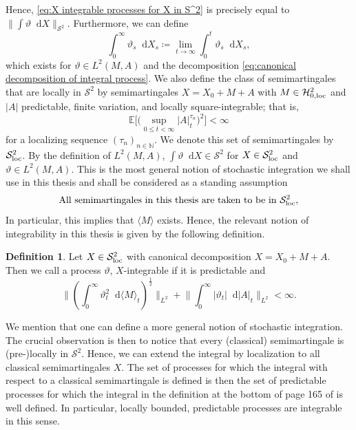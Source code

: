 \documentclass[11pt,a4paper,twoside,openany]{report}
\numberwithin{equation}{section}
\newcommand{\diff}{\mathop{}\!\mathrm{d}}
\theoremstyle{plain} %
\theoremstyle{definition} %
\newtheorem{definition}[theorem]{Definition}
\theoremstyle{remark} %
\let\parencite\authnumparencite
\begin{document}
Hence, \eqref{eq:X integrable processes for X in S^2} is precisely equal to \(\lVert\int \vartheta\diff X\rVert_{\mathcal{S}^2}\).
Furthermore, we can define
\begin{equation*}
   \int_0^\infty\vartheta_s\diff X_s \coloneqq \lim_{t\to\infty}\int_0^t\vartheta_s\diff X_s,
\end{equation*}
which exists for \(\vartheta\in L^2(M,A)\) and the decomposition \eqref{eq:canonical decomposition of integral process}.
We also define the class of semimartingales that are locally in \(\mathcal{S}^2\) by semimartingales \(X=X_0+M+A\) with \(M\in\mathcal{H}^2_{0,\rm{loc}}\) and \(|A|\) predictable, finite variation, and locally square-integrable; that is, 
\begin{equation*}
    \mathbb{E}\bigg[\Big(\sup_{0\leq t<\infty}|A|^{\tau_n}_t\Big)^2\bigg]<\infty
\end{equation*}
for a localizing sequence \((\tau_n)_{n\in\mathbb{N}}\). We denote this set of semimartingales by  \(\mathcal{S}^2_{\rm{loc}}\). By the definition of \(L^2(M,A)\), \(\int\vartheta\diff X\in\mathcal{S}^2\) for \(X\in\mathcal{S}^2_{\rm{loc}}\) and \(\vartheta\in L^2(M,A)\).
 This is the most general notion of stochastic integration we shall use in this thesis and shall be considered as a standing assumption
\begin{align*}
    \text{All semimartingales in this thesis are taken to be in \(\mathcal{S}_{\rm{loc}}^2\)},
\end{align*}
In particular, this implies that \(\langle M\rangle\) exists. Hence, the relevant notion of integrability in this thesis is given by the following definition.
\begin{definition}\label{def:X integrable processes for X in S^2_loc}
    Let \(X\in\mathcal{S}^2_{\rm{loc}}\) with canonical decomposition \(X=X_0+M+A\). Then we call a process \(\vartheta\), \(X\)-integrable if it is predictable and
    \begin{equation*}
        \bigg\lVert\left(\int_0^{\infty}\vartheta_t^2\diff \langle M\rangle_t\right)^{\frac{1}{2}}\bigg\rVert_{L^2}+\bigg\lVert \int_0^{\infty}|\vartheta_t|\diff |A|_t\bigg\rVert_{L^2}<\infty.
    \end{equation*}
\end{definition}

We mention that one can define a more general notion of stochastic integration. 
The crucial observation is then to notice that every (classical) semimartingale is (pre-)locally in \(\mathcal{S}^2\). Hence, we can extend the integral by localization to all classical semimartingales \(X\). The set of processes for which the integral with respect to a classical semimartingale is defined is then the set of predictable processes for which the integral in the definition at the bottom of page 165 of \parencite{Protter2005StochasticIntegration} is well defined. In particular, locally bounded, predictable processes are integrable in this sense.
\end{document}
